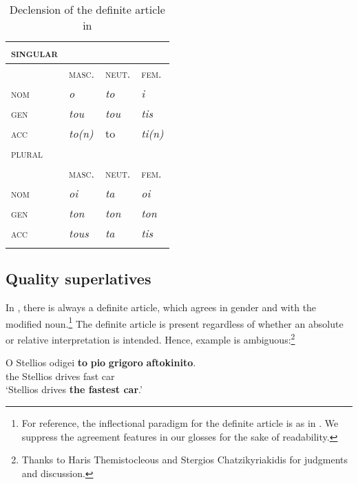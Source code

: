 \documentclass[output=paper
,modfonts
,nonflat]{langsci/langscibook}
\begin{document}
\begin{table}[h]
\caption{Declension of the definite article in }
\label{tab:coppockstrand:2}
\begin{tabularx}{0.5\textwidth}{ l X X X }
\lsptoprule
\textsc{singular} \\\midrule
& \textsc{masc.} & \textsc{neut.} & \textsc{fem.}\\\midrule
\textsc{nom} & \textit{o} & \textit{to} & \textit{i}\\
\textsc{gen} & \textit{tou} & \textit{tou} & \textit{tis}\\
\textsc{acc} & \textit{to(n)} & to & \textit{ti(n)}\\\midrule
\textsc{plural} \\\midrule
& \textsc{masc.} & \textsc{neut.} & \textsc{fem.}\\\midrule
\textsc{nom} & \textit{oi} & \textit{ta} & \textit{oi}\\
\textsc{gen} & \textit{ton} & \textit{ton} & \textit{ton}\\
\textsc{acc} & \textit{tous} & \textit{ta} & \textit{tis} \\\lspbottomrule
\end{tabularx}
\end{table}

\subsection{Quality superlatives}

In , there is always a definite article, which agrees in gender and  with the modified noun.\footnote{For reference, the inflectional paradigm for the definite article is as in . We suppress the agreement features in our glosses for the sake of readability.}
The definite article is present regardless of whether an absolute or relative interpretation is intended. Hence, example  is ambiguous:\footnote{Thanks to Haris Themistocleous and Stergios Chatzikyriakidis for judgments and discussion.}

\ea \label{ex:coppockstrand:7}
\gll O Stellios odigei \textbf{to} \textbf{pio} \textbf{grigoro} \textbf{aftokinito}.\\
the Stellios drives  \cmpr{} fast car\\
\glt `Stellios drives \textbf{the fastest car}.'
\z
\end{document}
